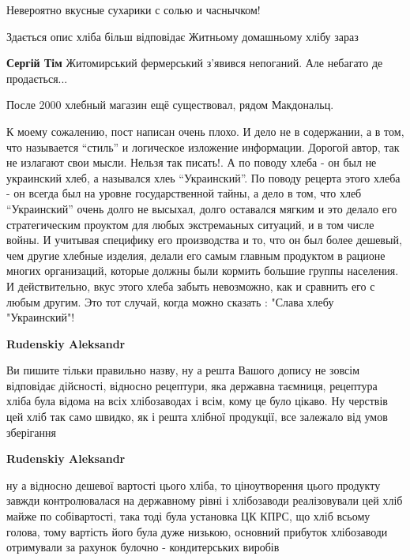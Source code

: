 \begin{itemize}
Невероятно вкусные сухарики с солью и часнычком!

Здається опис хліба більш відповідає Житньому домашньому хлібу зараз

\begin{itemize} %
\textbf{Сергій Тім} Житомирський фермерський з'явився непоганий. Але небагато де продається...
\end{itemize} %

После 2000 хлебный магазин ещё существовал, рядом Макдональц.


К моему сожалению, пост написан очень плохо. И дело не в содержании, а в том,
что называется \enquote{стиль} и логическое изложение информации. Дорогой автор, так не
излагают свои мысли. Нельзя так писать!. А по поводу хлеба - он был не
украинский хлеб, а назывался хлеь \enquote{Украинский}. По поводу рецерта этого хлеба -
он всегда был на уровне государственной тайны, а дело в том, что хлеб
\enquote{Украинский} очень долго не высыхал, долго оставался мягким и это делало его
стратегическим проуктом для любых экстремаьных ситуаций, и в том числе войны. И
учитывая специфику его производства и то, что он был более дешевый, чем другие
хлебные изделия, делали его самым главным продуктом в рационе многих
организаций, которые должны были кормить большие группы населения. И
действительно, вкус этого хлеба забыть невозможно, как и сравнить его с любым
другим. Это тот случай, когда можно сказать : "Слава хлебу "Украинский"!

\begin{itemize} %
\textbf{Rudenskiy Aleksandr} 

Ви пишите тільки правильно назву, ну а решта Вашого допису не зовсім відповідає
дійсності, відносно рецептури, яка державна таємниця, рецептура хліба була
відома на всіх хлібозаводах і всім, кому це було цікаво. Ну черствів цей хліб
так само швидко, як і решта хлібної продукції, все залежало від умов
зберігання


\textbf{Rudenskiy Aleksandr} 

ну а відносно дешевої вартості цього хліба, то ціноутворення цього продукту
завжди контролювалася на державному рівні і хлібозаводи реалізовували цей хліб
майже по собівартості, така тоді була установка ЦК КПРС, що хліб всьому
голова, тому вартість його була дуже низькою, основний прибуток хлібозаводи
отримували за рахунок булочно - кондитерських виробів


\end{itemize}
\end{itemize}
